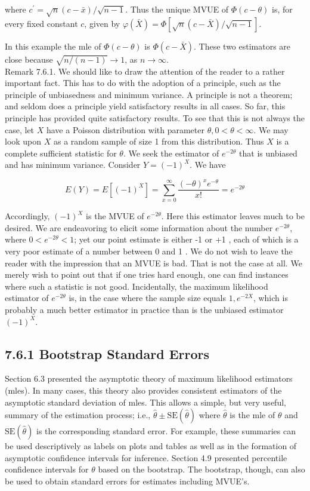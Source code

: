 where $c^{\prime}=\sqrt{n}(c-\bar{x}) / \sqrt{n-1}$. Thus the unique MVUE of $\Phi(c-\theta)$ is, for every fixed constant $c$, given by $\varphi(\bar{X})=\Phi[\sqrt{n}(c-\bar{X}) / \sqrt{n-1}]$.

In this example the mle of $\Phi(c-\theta)$ is $\Phi(c-\bar{X})$. These two estimators are close because $\sqrt{n /(n-1)} \rightarrow 1$, as $n \rightarrow \infty$.\\
Remark 7.6.1. We should like to draw the attention of the reader to a rather important fact. This has to do with the adoption of a principle, such as the principle of unbiasedness and minimum variance. A principle is not a theorem; and seldom does a principle yield satisfactory results in all cases. So far, this principle has provided quite satisfactory results. To see that this is not always the case, let $X$ have a Poisson distribution with parameter $\theta, 0<\theta<\infty$. We may look upon $X$ as a random sample of size 1 from this distribution. Thus $X$ is a complete sufficient statistic for $\theta$. We seek the estimator of $e^{-2 \theta}$ that is unbiased and has minimum variance. Consider $Y=(-1)^{X}$. We have

$$
E(Y)=E\left[(-1)^{X}\right]=\sum_{x=0}^{\infty} \frac{(-\theta)^{x} e^{-\theta}}{x!}=e^{-2 \theta}
$$

Accordingly, $(-1)^{X}$ is the MVUE of $e^{-2 \theta}$. Here this estimator leaves much to be desired. We are endeavoring to elicit some information about the number $e^{-2 \theta}$, where $0<e^{-2 \theta}<1$; yet our point estimate is either -1 or +1 , each of which is a very poor estimate of a number between 0 and 1 . We do not wish to leave the reader with the impression that an MVUE is bad. That is not the case at all. We merely wish to point out that if one tries hard enough, one can find instances where such a statistic is not good. Incidentally, the maximum likelihood estimator of $e^{-2 \theta}$ is, in the case where the sample size equals $1, e^{-2 X}$, which is probably a much better estimator in practice than is the unbiased estimator $(-1)^{X}$.

\subsection*{7.6.1 Bootstrap Standard Errors}
Section 6.3 presented the asymptotic theory of maximum likelihood estimators (mles). In many cases, this theory also provides consistent estimators of the asymptotic standard deviation of mles. This allows a simple, but very useful, summary of the estimation process; i.e., $\hat{\theta} \pm \mathrm{SE}(\hat{\theta})$ where $\hat{\theta}$ is the mle of $\theta$ and $\mathrm{SE}(\hat{\theta})$ is the corresponding standard error. For example, these summaries can be used descriptively as labels on plots and tables as well as in the formation of asymptotic confidence intervals for inference. Section 4.9 presented percentile confidence intervals for $\theta$ based on the bootstrap. The bootstrap, though, can also be used to obtain standard errors for estimates including MVUE's.

